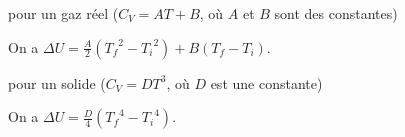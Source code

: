 
\begin{enonce}
 pour un gaz réel ($C_V=AT+B$, où $A$ et $B$ sont des constantes)
\end{enonce}


\begin{corrige}
	On a $\Delta U = \frac{A}{2}({T_f}^2-{T_i}^2)+B(T_f-T_i)$.
\end{corrige}



\begin{enonce}
	pour un solide ($C_V=DT^3$, où $D$ est une constante)
\end{enonce}


\begin{corrige}
	On a $\Delta U =\frac{D}{4}({T_f}^4-{T_i}^4)$.
\end{corrige}





\hauteurLargeurCadreReponse		{6mm}{3cm}
\initialisationEntrainement



\debutEntrainement


